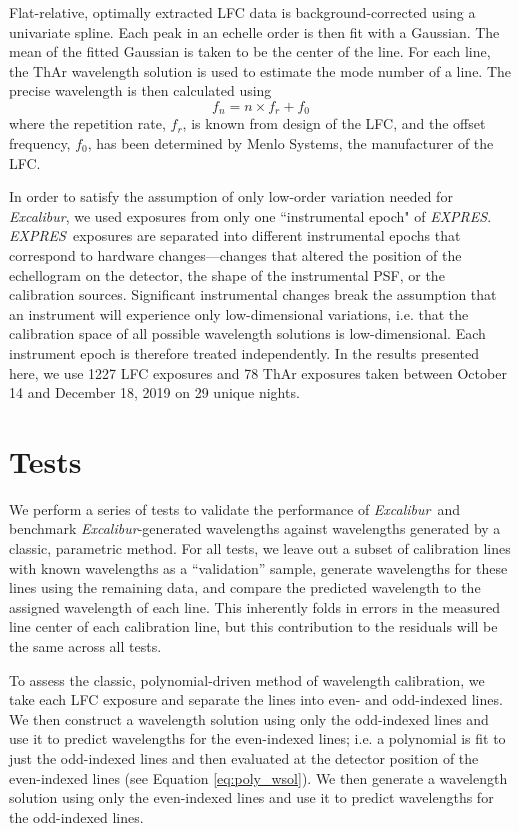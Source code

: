 \documentclass[modern]{aastex63}
\newcommand{\project}[1]{\textsl{#1}}
\newcommand{\name}{\project{Excalibur}}
\newcommand{\acronym}[1]{{\small{#1}}}
\newcommand{\expres}{\project{\acronym{EXPRES}}}
\begin{document}
 Flat-relative, optimally extracted LFC data is background-corrected using a univariate spline.  Each peak in an echelle order is then fit with a Gaussian.  The mean of the fitted Gaussian is taken to be the center of the line.  For each line, the ThAr wavelength solution is used to estimate the mode number of a line.  The precise wavelength is then calculated using
 \begin{equation}
 f_n = n \times  f_r + f_0
 \label{eq:lfc}
 \end{equation}
 where the repetition rate, $f_r$, is known from design of the LFC, and the offset frequency, $f_0$, has been determined by Menlo Systems, the manufacturer of the LFC.
 
In order to satisfy the assumption of only low-order variation needed for \name, we used exposures from only one ``instrumental epoch" of \expres.  \expres\ exposures are separated into different instrumental epochs that correspond to hardware changes---changes that altered the position of the echellogram on the detector, the shape of the instrumental PSF, or the calibration sources.  Significant instrumental changes break the assumption that an  instrument will experience only low-dimensional variations, i.e. that the calibration space of all possible wavelength solutions is low-dimensional.  Each instrument epoch is therefore treated independently.  In the results presented here, we use 1227 LFC exposures and 78 ThAr exposures taken between October 14 and December 18, 2019 on 29 unique nights.


\section{Tests}\label{sec:tests}
We perform a series of tests to validate the performance of \name\ and benchmark \name -generated wavelengths against wavelengths generated by a classic, parametric method.  For all tests, we leave out a subset of calibration lines with known wavelengths as a ``validation'' sample, generate wavelengths for these lines using the remaining data, and compare the predicted wavelength to the assigned wavelength of each line.  This inherently folds in errors in the measured line center of each calibration line, but this contribution to the residuals will be the same across all tests.

To assess the classic, polynomial-driven method of wavelength calibration, we take each LFC exposure and separate the lines into even- and odd-indexed lines.  We then construct a wavelength solution using only the odd-indexed lines and use it to predict wavelengths for the even-indexed lines; i.e. a polynomial is fit to just the odd-indexed lines and then evaluated at the detector position of the even-indexed lines (see Equation \ref{eq:poly_wsol}).  We then generate a wavelength solution using only the even-indexed lines and use it to predict wavelengths for the odd-indexed lines.
\end{document}

